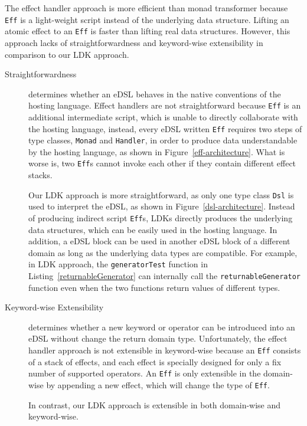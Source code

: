 The effect handler approach is more efficient than monad transformer because \lstinline{Eff} is a light-weight script instead of the underlying data structure. Lifting an atomic effect to an \lstinline{Eff} is faster than lifting real data structures. However, this approach lacks of straightforwardness and keyword-wise extensibility in comparison to our LDK approach.

\begin{description}
  \item[Straightforwardness] determines whether an eDSL behaves in the native conventions of the hosting language. Effect handlers are not straightforward because \lstinline{Eff} is an additional intermediate script, which is unable to directly collaborate with the hosting language, instead, every eDSL written \lstinline{Eff} requires two steps of type classes, \lstinline{Monad} and \lstinline{Handler}, in order to produce data understandable by the hosting language, as shown in Figure~\ref{eff-architecture}. What is worse is, two \lstinline{Eff}s cannot invoke each other if they contain different effect stacks.

  Our LDK approach is more straightforward, as only one type class \lstinline{Dsl} is used to interpret the eDSL, as shown in Figure~\ref{dsl-architecture}. Instead of producing indirect script \lstinline{Eff}s, LDKs directly produces the underlying data structures, which can be easily used in the hosting language. In addition, a eDSL block can be used in another eDSL block of a different domain as long as the underlying data types are compatible. For example, in LDK approach, the \lstinline{generatorTest} function in Listing~\ref{returnableGenerator} can internally call the \lstinline{returnableGenerator} function even when the two functions return values of different types.

  \item[Keyword-wise Extensibility] determines whether a new keyword or operator can be introduced into an eDSL without change the return domain type. Unfortunately, the effect handler approach is not extensible in keyword-wise because an \lstinline{Eff} consists of a stack of effects, and each effect is specially designed for only a fix number of supported operators. An \lstinline{Eff} is only extensible in the domain-wise by appending a new effect, which will change the type of \lstinline{Eff}. 

  In contrast, our LDK approach is extensible in both domain-wise and keyword-wise.

\end{description}

